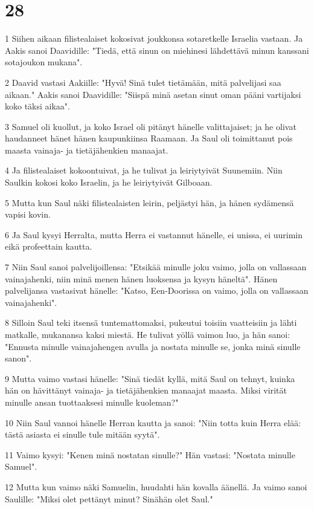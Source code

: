 \chapter{28}

\par 1 Siihen aikaan filistealaiset kokosivat joukkonsa sotaretkelle Israelia vastaan. Ja Aakis sanoi Daavidille: "Tiedä, että sinun on miehinesi lähdettävä minun kanssani sotajoukon mukana".
\par 2 Daavid vastasi Aakiille: "Hyvä! Sinä tulet tietämään, mitä palvelijasi saa aikaan." Aakis sanoi Daavidille: "Siispä minä asetan sinut oman pääni vartijaksi koko täksi aikaa".
\par 3 Samuel oli kuollut, ja koko Israel oli pitänyt hänelle valittajaiset; ja he olivat haudanneet hänet hänen kaupunkiinsa Raamaan. Ja Saul oli toimittanut pois maasta vainaja- ja tietäjähenkien manaajat.
\par 4 Ja filistealaiset kokoontuivat, ja he tulivat ja leiriytyivät Suunemiin. Niin Saulkin kokosi koko Israelin, ja he leiriytyivät Gilboaan.
\par 5 Mutta kun Saul näki filistealaisten leirin, peljästyi hän, ja hänen sydämensä vapisi kovin.
\par 6 Ja Saul kysyi Herralta, mutta Herra ei vastannut hänelle, ei unissa, ei uurimin eikä profeettain kautta.
\par 7 Niin Saul sanoi palvelijoillensa: "Etsikää minulle joku vaimo, jolla on vallassaan vainajahenki, niin minä menen hänen luoksensa ja kysyn häneltä". Hänen palvelijansa vastasivat hänelle: "Katso, Een-Doorissa on vaimo, jolla on vallassaan vainajahenki".
\par 8 Silloin Saul teki itsensä tuntemattomaksi, pukeutui toisiin vaatteisiin ja lähti matkalle, mukanansa kaksi miestä. He tulivat yöllä vaimon luo, ja hän sanoi: "Ennusta minulle vainajahengen avulla ja nostata minulle se, jonka minä sinulle sanon".
\par 9 Mutta vaimo vastasi hänelle: "Sinä tiedät kyllä, mitä Saul on tehnyt, kuinka hän on hävittänyt vainaja- ja tietäjähenkien manaajat maasta. Miksi virität minulle ansan tuottaaksesi minulle kuoleman?"
\par 10 Niin Saul vannoi hänelle Herran kautta ja sanoi: "Niin totta kuin Herra elää: tästä asiasta ei sinulle tule mitään syytä".
\par 11 Vaimo kysyi: "Kenen minä nostatan sinulle?" Hän vastasi: "Nostata minulle Samuel".
\par 12 Mutta kun vaimo näki Samuelin, huudahti hän kovalla äänellä. Ja vaimo sanoi Saulille: "Miksi olet pettänyt minut? Sinähän olet Saul."
